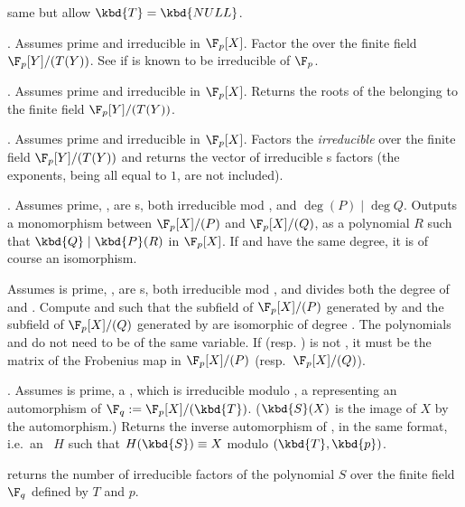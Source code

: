 same but allow $\kbd{T} = \kbd{NULL}$.

. Assumes  prime
and  irreducible in $\F_p[X]$. Factor the  
over the finite field $\F_p[Y]/(T(Y))$. See 
if  is known to be irreducible of $\F_p$.

. Assumes  prime
and  irreducible in $\F_p[X]$. Returns the roots of the 
 belonging to the finite field $\F_p[Y]/(T(Y))$.

. Assumes  prime
and  irreducible in $\F_p[X]$. Factors the \emph{irreducible}
  over the finite field $\F_p[Y]/(T(Y))$ and returns the
vector of irreducible s factors (the exponents, being all equal to
$1$, are not included).

. Assumes  prime,
,  are s, both irreducible mod , and
$\deg(P) \mid \deg Q$. Outputs a monomorphism between $\F_p[X]/(P)$ and
$\F_p[X]/(Q)$, as a polynomial $R$ such that $\kbd{Q} \mid \kbd{P}(R)$ in
$\F_p[X]$. If  and  have the same degree, it is of course an
isomorphism.

\hfil\break
Assumes  is prime, ,  are s, both
irreducible mod , and  divides both the degree of  and
. Compute  and  such that the subfield of
$\F_p[X]/(P)$ generated by  and the subfield of $\F_p[X]/(Q)$
generated by  are isomorphic of degree . The polynomials
 and  do not need to be of the same variable. If 
(resp. ) is not , it must be the matrix of the Frobenius
map in $\F_p[X]/(P)$ (resp.~$\F_p[X]/(Q)$).

. Assumes  is prime,
 a , which is irreducible modulo ,  a
 representing an automorphism of $\F_q := \F_p[X]/(\kbd{T})$.
($\kbd{S}(X)$ is the image of $X$ by the automorphism.) Returns the
inverse automorphism of , in the same format, i.e.~an ~$H$
such that $H(\kbd{S}) \equiv X$ modulo $(\kbd{T}, \kbd{p})$.

 returns the number of
irreducible factors of the polynomial $S$ over the finite field $\F_q$
defined by $T$ and $p$.

